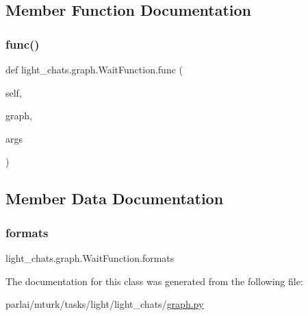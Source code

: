 \subsection{Member Function Documentation}
\mbox{\label{classlight__chats_1_1graph_1_1WaitFunction_a3349dc4d65c4b33440624bdbbeeb420c}} 
\subsubsection{\texorpdfstring{func()}{func()}}
{\footnotesize\ttfamily def light\+\_\+chats.\+graph.\+Wait\+Function.\+func (\begin{DoxyParamCaption}\item[{}]{self,  }\item[{}]{graph,  }\item[{}]{args }\end{DoxyParamCaption})}



\subsection{Member Data Documentation}
\mbox{\label{classlight__chats_1_1graph_1_1WaitFunction_a02e41ee37f4a2fe83153606100a5f979}} 
\subsubsection{\texorpdfstring{formats}{formats}}
{\footnotesize\ttfamily light\+\_\+chats.\+graph.\+Wait\+Function.\+formats}



The documentation for this class was generated from the following file\+:\begin{DoxyCompactItemize}
\item 
parlai/mturk/tasks/light/light\+\_\+chats/\hyperlink{parlai_2mturk_2tasks_2light_2light__chats_2graph_8py}{graph.\+py}\end{DoxyCompactItemize}
